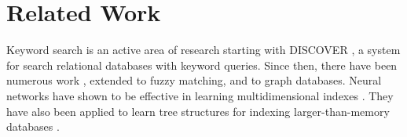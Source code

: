 \documentclass[conference]{IEEEtran}
\begin{document}

\section{Related Work}

Keyword search is an active area of research starting with DISCOVER \cite{hristidis2002discover}, a system for search relational databases with keyword queries.  Since then, there have been numerous work \cite{yu2022keyword}, extended to fuzzy matching, and to graph databases.  Neural networks have shown to be effective in learning multidimensional indexes \cite{tsunamivldb,DBLP:conf/sigmod/NathanDAK20}.  They have also been applied to learn tree structures for indexing larger-than-memory databases \cite{ma2022film}.



\end{document}
